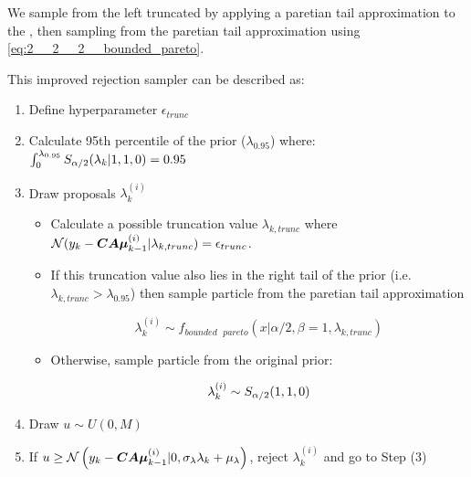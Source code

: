 \documentclass[../main.tex]{subfiles}
\begin{document}
We sample from the left truncated \asd  by applying a paretian tail approximation to the \asd, then sampling from the paretian tail approximation using \autoref{eq:2__2__2__bounded_pareto}.

This improved rejection sampler can be described as:

\begin{enumerate}
	
	\item Define hyperparameter $\epsilon_{trunc}$
	\item Calculate 95th percentile of the prior ($\lambda_{0.95}$) where: $\int_{0}^{\lambda_{0.95}}S_{\alpha/2}(\lambda_k | 1,1,0) = 0.95$
	
	\item Draw proposals $\lambda_k^{(i)}$
	\begin{itemize}
		\item Calculate a possible truncation value $\lambda_{k, trunc}$ where $\mathcal{N}(y_k - \bm{CA\mu}_{k-1}^{(i)} | \lambda_{k, trunc}) = \epsilon_{trunc}$.
		\item If this truncation value also lies in the right tail of the prior (i.e. $\lambda_{k, trunc} > \lambda_{0.95}$) then sample particle from the paretian tail approximation
		
		$$ \lambda_k^{(i)} \sim f_{bounded \text{ }pareto}(x | \alpha/2, \beta = 1, \lambda_{k, trunc}) $$
		
		\item Otherwise, sample particle from the original prior:
		
		$$ \lambda_k^{(i)} \sim S_{\alpha/2}(1,1,0) $$
	\end{itemize}
	
	\item Draw $ u \sim U ( 0, M )$
	\item If $u \geq \mathcal{N}\left( y_k - \bm{CA\mu}_{k-1}^{(i)} | 0, \sigma_\lambda \lambda_k + \mu_\lambda \right)$, reject $\lambda_k^{(i)}$ and go to Step (3)
\end{enumerate}



%
%
%
%
%
%
\end{document}
